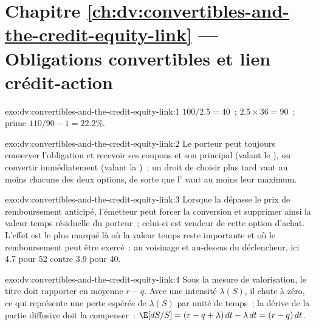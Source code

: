 \section*{Chapitre \ref{ch:dv:convertibles-and-the-credit-equity-link} --- Obligations convertibles et lien crédit-action}

\begin{solution}{exo:dv:convertibles-and-the-credit-equity-link:1}
 $100/2.5=40$~;  $2.5\times36=90$~; prime $110/90-1=22.2\%$.
\end{solution}

\begin{solution}{exo:dv:convertibles-and-the-credit-equity-link:2}
Le porteur peut toujours conserver l'obligation et recevoir ses coupons et son principal (valant le ), ou convertir immédiatement (valant la )~;
un droit de choisir plus tard vaut au moins chacune des deux options, de sorte que l' vaut au moins leur maximum.
\end{solution}

\begin{solution}{exo:dv:convertibles-and-the-credit-equity-link:3}
Lorsque la  dépasse le prix de remboursement anticipé, l'émetteur peut forcer la conversion et supprimer ainsi la valeur temps résiduelle du porteur~; celui-ci est
vendeur de cette option d'achat. L'effet est le plus marqué là où la valeur temps reste importante et où le remboursement peut être exercé~: au voisinage et au-dessus du déclencheur, ici 4.7 pour
52 contre 3.9 pour 40.
\end{solution}

\begin{solution}{exo:dv:convertibles-and-the-credit-equity-link:4}
Sous la mesure de valorisation, le titre doit rapporter en moyenne $r-q$. Avec une intensité $\lambda(S)$, il chute à zéro, ce qui représente une perte espérée de $\lambda(S)$ par
unité de temps~; la dérive de la partie diffusive doit la compenser~: $\E[dS/S]=(r-q+\lambda)\,dt-\lambda\,dt=(r-q)\,dt$.
\end{solution}

